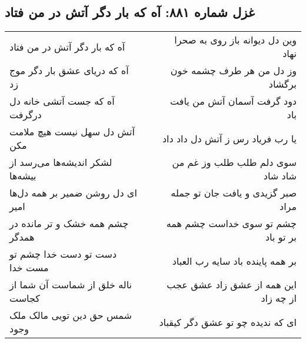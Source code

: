 \begin{center}
\section*{غزل شماره ۸۸۱: آه که بار دگر آتش در من فتاد}
\label{sec:0881}
\begin{longtable}{l p{0.5cm} r}
آه که بار دگر آتش در من فتاد
&&
وین دل دیوانه باز روی به صحرا نهاد
\\
آه که دریای عشق بار دگر موج زد
&&
وز دل من هر طرف چشمه خون برگشاد
\\
آه که جست آتشی خانه دل درگرفت
&&
دود گرفت آسمان آتش من یافت باد
\\
آتش دل سهل نیست هیچ ملامت مکن
&&
یا رب فریاد رس ز آتش دل داد داد
\\
لشکر اندیشه‌ها می‌رسد از بیشه‌ها
&&
سوی دلم طلب طلب وز غم من شاد شاد
\\
ای دل روشن ضمیر بر همه دل‌ها امیر
&&
صبر گزیدی و یافت جان تو جمله مراد
\\
چشم همه خشک و تر مانده در همدگر
&&
چشم تو سوی خداست چشم همه بر تو باد
\\
دست تو دست خدا چشم تو مست خدا
&&
بر همه پاینده باد سایه رب العباد
\\
ناله خلق از شماست آن شما از کجاست
&&
این همه از عشق زاد عشق عجب از چه زاد
\\
شمس حق دین تویی مالک ملک وجود
&&
ای که ندیده چو تو عشق دگر کیقباد
\\
\end{longtable}
\end{center}
